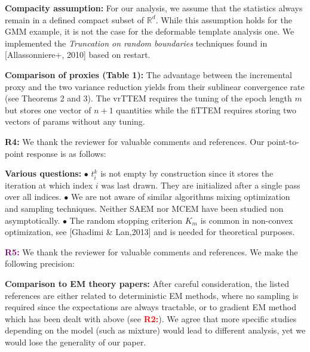 \documentclass{article}
\begin{document}
\textbf{Compacity assumption:}  
For our analysis, we assume that the statistics always remain in a defined compact subset of $\mathbb{R}^d$.
While this assumption holds for the GMM example, it is not the case for the deformable template analysis one.
We implemented the \emph{Truncation on random boundaries} techniques found in [Allassonniere+, 2010] based on restart.

\textbf{Comparison of proxies (Table 1):} 
The advantage between the incremental proxy and the two variance reduction yields from their sublinear convergence rate (see Theorems 2 and 3).
The vrTTEM requires the tuning of the epoch length $m$ but stores one vector of $n+1$ quantities while the fiTTEM requires storing two vectors of params without any tuning.\vspace{-0.05in}

\textbf{\textcolor{yellow!50!black}{R4:}} We thank the reviewer for valuable comments and references. Our point-to-point response is as follows:\vspace{-0.05in}

\textbf{Various questions:} $\bullet$ $t_i^k$ is not empty by construction since it stores the iteration at which index $i$ was last drawn. 
They are initialized after a single pass over all indices.
$\bullet$ We are not aware of similar algorithms mixing optimization and sampling techniques. 
Neither SAEM nor MCEM have been studied non asymptotically.
$\bullet$ The random stopping criterion $K_m$ is common in non-convex optimization, see [Ghadimi \& Lan,2013] and is needed for theoretical purposes.\vspace{-0.05in}


\textbf{\textcolor{purple}{R5:}} We thank the reviewer for valuable comments and references. We make the following precision:\vspace{-0.05in}

\textbf{Comparison to EM theory papers:}
After careful consideration, the listed references are either related to deterministic EM methods, where no sampling is required since the expectations are always tractable, or to gradient EM method which has been dealt with above (see \textbf{\textcolor{red}{R2:}}).
We agree that more specific studies depending on the model (such as mixture) would lead to different analysis, yet we would lose the generality of our paper.
\end{document}
